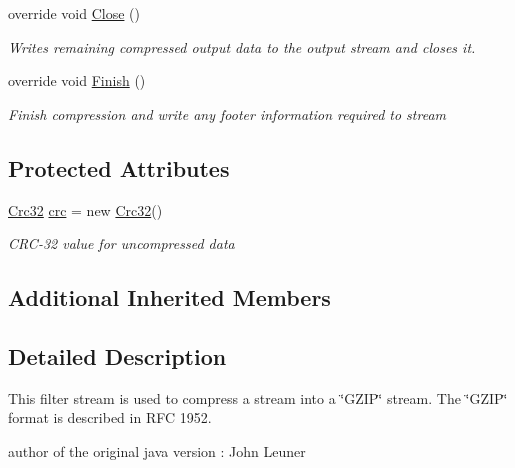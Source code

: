 \begin{DoxyCompactItemize}
override void \hyperlink{class_i_c_sharp_code_1_1_sharp_zip_lib_1_1_g_zip_1_1_g_zip_output_stream_a0521462daeefec738f019334f1d756ad}{Close} ()
\begin{DoxyCompactList}\small\item\em Writes remaining compressed output data to the output stream and closes it. \end{DoxyCompactList}\item 
override void \hyperlink{class_i_c_sharp_code_1_1_sharp_zip_lib_1_1_g_zip_1_1_g_zip_output_stream_aa05826de1aa44d880f643cf489fd7f24}{Finish} ()
\begin{DoxyCompactList}\small\item\em Finish compression and write any footer information required to stream \end{DoxyCompactList}\end{DoxyCompactItemize}
\subsection*{Protected Attributes}
\begin{DoxyCompactItemize}
\item 
\hyperlink{class_i_c_sharp_code_1_1_sharp_zip_lib_1_1_checksums_1_1_crc32}{Crc32} \hyperlink{class_i_c_sharp_code_1_1_sharp_zip_lib_1_1_g_zip_1_1_g_zip_output_stream_ae522d9fb4e175250e7c4b6325c071b52}{crc} = new \hyperlink{class_i_c_sharp_code_1_1_sharp_zip_lib_1_1_checksums_1_1_crc32}{Crc32}()
\begin{DoxyCompactList}\small\item\em C\+R\+C-\/32 value for uncompressed data \end{DoxyCompactList}\end{DoxyCompactItemize}
\subsection*{Additional Inherited Members}


\subsection{Detailed Description}
This filter stream is used to compress a stream into a \char`\"{}\+G\+Z\+I\+P\char`\"{} stream. The \char`\"{}\+G\+Z\+I\+P\char`\"{} format is described in R\+FC 1952. 

author of the original java version \+: John Leuner 

